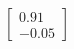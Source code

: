 \documentclass[preview]{standalone}
\begin{document}
\begin{align*}
\begin{bmatrix} 0.91 \\ -0.05 \end{bmatrix}
\end{align*}
\end{document}
